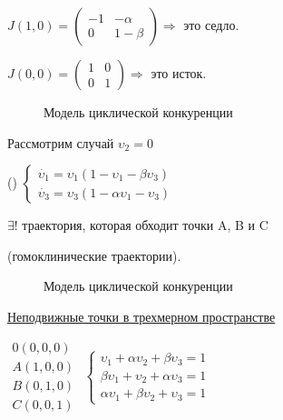 \vspace{0.5cm}
\(
 J(1,0) = 
 \begin{pmatrix}
 -1 & -\alpha \\ 
 0 & 1 - \beta
 \end{pmatrix}
\)\hspace{0.5cm}\(\Rightarrow\) это седло.

\vspace{0.5cm}
\(
 J(0,0) = 
 \begin{pmatrix}
 1 & 0\\
 0 & 1
 \end{pmatrix}
\)\hspace{0.5cm}\(\Rightarrow\) это исток.
\begin{figure} [h!]
			\caption{Модель циклической конкуренции}	
\end{figure}

\newpage
Рассмотрим случай { \underline{\(\upsilon_2 = 0\)}}

\vspace{0.5cm}
({})
\(
 \begin{cases}
 	\dot{\upsilon_1} = \upsilon_1(1-\upsilon_1 - \beta\upsilon_3)
 	\\
 	\dot{\upsilon_3} = \upsilon_3(1-\alpha\upsilon_1 - \upsilon_3)
 \end{cases}
\)

\vspace{0.5cm}
\(\exists!\) траектория, которая обходит точки  A, B и C

(гомоклинические траектории).
\begin{figure} [h!]
			\caption{Модель циклической конкуренции}	
\end{figure}

\vspace{0.5cm}
{\underline{Неподвижные точки в трехмерном пространстве}}

\vspace{0.5cm}
\(
 \begin{matrix}
 0(0,0,0)\\
 A(1,0,0)\\
 B(0,1,0)\\
 C(0,0,1)
 \end{matrix}
\)\hspace{2cm}
\(
 \begin{cases}
 	\upsilon_1 + \alpha\upsilon_2 + \beta\upsilon_3 = 1
 	\\
 	\beta\upsilon_1 + \upsilon_2 + \alpha\upsilon_3 = 1
 	\\
 	\alpha\upsilon_1 + \beta\upsilon_2 + \upsilon_3 = 1
 \end{cases}
\)


